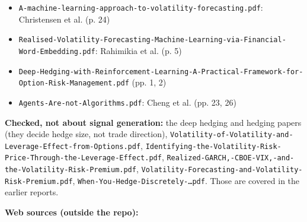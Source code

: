 \documentclass{article}
\begin{document}
\begin{itemize}
\item \texttt{A-\allowbreak{}machine-\allowbreak{}learning-\allowbreak{}approach-\allowbreak{}to-\allowbreak{}volatility-\allowbreak{}forecasting.\allowbreak{}pdf}: Christensen et al. (p. 24)

\item \texttt{Realised-\allowbreak{}Volatility-\allowbreak{}Forecasting-\allowbreak{}Machine-\allowbreak{}Learning-\allowbreak{}via-\allowbreak{}Financial-\allowbreak{}Word-\allowbreak{}Embedding.\allowbreak{}pdf}: Rahimikia et al. (p. 5)

\item \texttt{Deep-\allowbreak{}Hedging-\allowbreak{}with-\allowbreak{}Reinforcement-\allowbreak{}Learning-\allowbreak{}A-\allowbreak{}Practical-\allowbreak{}Framework-\allowbreak{}for-\allowbreak{}Option-\allowbreak{}Risk-\allowbreak{}Management.\allowbreak{}pdf} (pp. 1, 2)

\item \texttt{Agents-\allowbreak{}Are-\allowbreak{}not-\allowbreak{}Algorithms.\allowbreak{}pdf}: Cheng et al. (pp. 23, 26)

\end{itemize}

\textbf{Checked, not about signal generation:} the deep hedging and hedging papers (they decide hedge size, not trade direction), \texttt{Volatility-\allowbreak{}of-\allowbreak{}Volatility-\allowbreak{}and-\allowbreak{}Leverage-\allowbreak{}Effect-\allowbreak{}from-\allowbreak{}Options.\allowbreak{}pdf}, \texttt{Identifying-\allowbreak{}the-\allowbreak{}Volatility-\allowbreak{}Risk-\allowbreak{}Price-\allowbreak{}Through-\allowbreak{}the-\allowbreak{}Leverage-\allowbreak{}Effect.\allowbreak{}pdf}, \texttt{Realized-\allowbreak{}GARCH,\allowbreak{}-\allowbreak{}CBOE-\allowbreak{}VIX,\allowbreak{}-\allowbreak{}and-\allowbreak{}the-\allowbreak{}Volatility-\allowbreak{}Risk-\allowbreak{}Premium.\allowbreak{}pdf}, \texttt{Volatility-\allowbreak{}Forecasting-\allowbreak{}and-\allowbreak{}Volatility-\allowbreak{}Risk-\allowbreak{}Premium.\allowbreak{}pdf}, \texttt{When-\allowbreak{}You-\allowbreak{}Hedge-\allowbreak{}Discretely-\allowbreak{}\ldots{}pdf}. Those are covered in the earlier reports.

\textbf{Web sources (outside the repo):}
\end{document}
